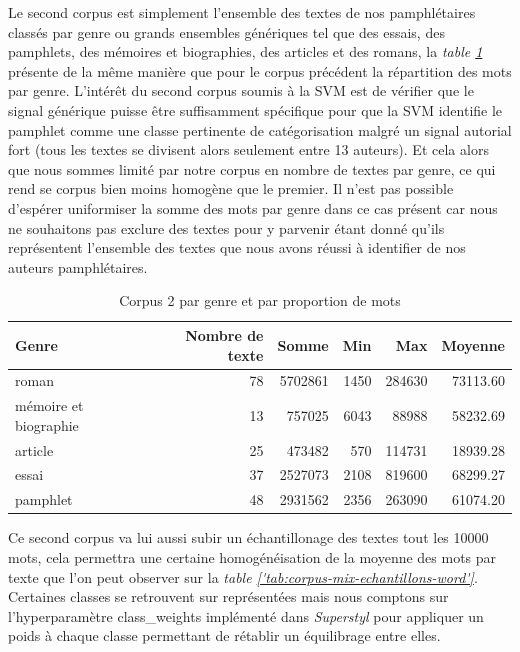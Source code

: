 Le second corpus est simplement l'ensemble des textes de nos pamphlétaires classés par genre ou grands ensembles génériques tel que des essais, des pamphlets, des mémoires et biographies, des articles et des romans, la \textit{table \ref{'tab:corpus-word'}} présente de la même manière que pour le corpus précédent la répartition des mots par genre.
L'intérêt du second corpus soumis à la SVM est de vérifier que le signal générique puisse être suffisamment spécifique pour que la SVM identifie le pamphlet comme une classe pertinente de catégorisation malgré un signal autorial fort (tous les textes se divisent alors seulement entre 13 auteurs). Et cela alors que nous sommes limité par notre corpus en nombre de textes par genre, ce qui rend se corpus bien moins homogène que le premier.
Il n'est pas possible d'espérer uniformiser la somme des mots par genre dans ce cas présent car nous ne souhaitons pas exclure des textes pour y parvenir étant donné qu'ils représentent l'ensemble des textes que nous avons réussi à identifier de nos auteurs pamphlétaires.

\begin{table}[H]
    \centering
    \begin{tabular}{lrrrrr}
    \toprule
    Genre & Nombre de texte & Somme & Min & Max & Moyenne  \\
    \toprule
    \midrule
    roman & 78 & 5702861 & 1450 & 284630 & 73113.60 \\
    \midrule
    mémoire et biographie & 13 & 757025 & 6043 & 88988 & 58232.69 \\
    \midrule
    article & 25 & 473482 & 570 & 114731 & 18939.28 \\
    \midrule
    essai & 37 & 2527073 & 2108 & 819600 & 68299.27 \\
    \midrule
    pamphlet & 48 & 2931562 & 2356 & 263090 & 61074.20 \\
    \bottomrule
    \end{tabular}
    \caption{Corpus 2 par genre et par proportion de mots}
    \label{'tab:corpus-word'}
\end{table}

Ce second corpus va lui aussi subir un échantillonage des textes tout les 10000 mots, cela permettra une certaine homogénéisation de la moyenne des mots par texte que l'on peut observer sur la \textit{table \ref{'tab:corpus-mix-echantillons-word'}}. Certaines classes se retrouvent sur représentées mais nous comptons sur l'hyperparamètre class\_weights implémenté dans \textit{Superstyl} pour appliquer un poids à chaque classe permettant de rétablir un équilibrage entre elles.

